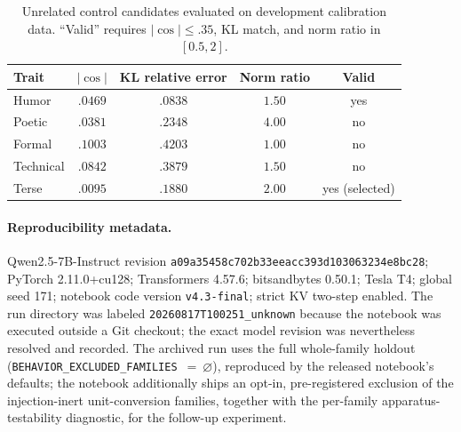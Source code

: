 \documentclass[11pt]{article}
\begin{document}
\begin{table}[h]
\centering
\caption{Unrelated control candidates evaluated on development calibration data. ``Valid'' requires $|\cos| \le .35$, KL match, and norm ratio in $[0.5, 2]$.}
\begin{tabular}{@{}lcccc@{}}
\toprule
Trait & $|\cos|$ & KL relative error & Norm ratio & Valid \\
\midrule
Humor     & $.0469$ & $.0838$ & $1.50$ & yes \\
Poetic    & $.0381$ & $.2348$ & $4.00$ & no \\
Formal    & $.1003$ & $.4203$ & $1.00$ & no \\
Technical & $.0842$ & $.3879$ & $1.50$ & no \\
Terse     & $.0095$ & $.1880$ & $2.00$ & yes (selected) \\
\bottomrule
\end{tabular}
\end{table}

\paragraph{Reproducibility metadata.} Qwen2.5-7B-Instruct revision \texttt{a09a35458c702b33eeacc393d103063234e8bc28}; PyTorch 2.11.0+cu128; Transformers 4.57.6; bitsandbytes 0.50.1; Tesla T4; global seed 171; notebook code version \texttt{v4.3-final}; strict KV two-step enabled. The run directory was labeled \texttt{20260817T100251\_unknown} because the notebook was executed outside a Git checkout; the exact model revision was nevertheless resolved and recorded. The archived run uses the full whole-family holdout (\texttt{BEHAVIOR\_EXCLUDED\_FAMILIES}~$=~\varnothing$), reproduced by the released notebook's defaults; the notebook additionally ships an opt-in, pre-registered exclusion of the injection-inert unit-conversion families, together with the per-family apparatus-testability diagnostic, for the follow-up experiment.
\end{document}
